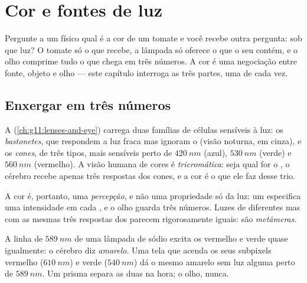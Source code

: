 \chapter{Cor e fontes de luz}\label{ch:g11:color-light-sources}

Pergunte a um físico qual é a cor de um tomate e você recebe outra
pergunta: sob que luz? O tomate só  o que recebe, a lâmpada só
oferece o que o seu  contém, e o olho comprime tudo o que chega
em três números. A cor é uma negociação entre fonte, objeto e olho ---
este capítulo interroga as três partes, uma de cada vez.

\section{Enxergar em três números}

\begin{definition}\label{def:g11:color-light-sources:cones}
A  (\cref{ch:g11:lenses-and-eye}) carrega duas famílias de células
sensíveis à luz: os \emph{bastonetes}, que respondem a
luz fraca mas ignoram o  (visão noturna, em cinza), e
os \emph{cones}, de três tipos, mais sensíveis perto de
$\qty{420}{nm}$ (azul), $\qty{530}{nm}$ (verde) e $\qty{560}{nm}$
(vermelho). A visão humana de cores é \emph{tricromática}: seja qual for o , o cérebro recebe apenas três
respostas dos cones, e a cor é o que ele faz desse trio.
\end{definition}

\begin{definition}\label{def:g11:color-light-sources:perception}
A cor é, portanto, uma \emph{percepção}, e não uma propriedade só da luz:
um  especifica uma intensidade em cada , e o
olho guarda três números. Luzes de  diferentes mas com as mesmas
três respostas dos  parecem rigorosamente iguais: são
\emph{metâmeras}.
\end{definition}

\begin{example}\label{ex:g11:color-light-sources:yellows}
A linha de $\qty{589}{nm}$ de uma lâmpada de sódio excita os 
vermelho e verde quase igualmente: o cérebro diz \emph{amarelo}. Uma tela
que acenda os seus subpixels vermelho ($\qty{610}{nm}$) e verde
($\qty{540}{nm}$) dá o mesmo amarelo sem luz alguma perto de
$\qty{589}{nm}$. Um prisma separa as duas na hora; o olho, nunca.
\end{example}


